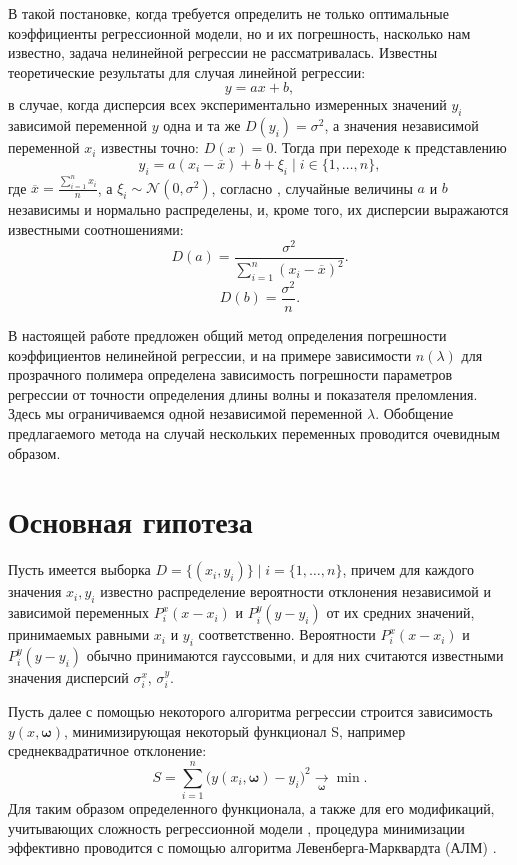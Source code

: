 \documentclass[11pt,a4paper]{article}
\theoremstyle{definition}
\begin{document}
В такой постановке, когда требуется определить не только
оптимальные коэффициенты регрессионной модели, но и их погрешность, насколько нам
известно, задача нелинейной регрессии не рассматривалась. Известны
теоретические результаты для случая линейной регрессии:
\[
  y = ax + b,
\]
в случае, когда дисперсия всех экспериментально измеренных значений $y_i$
зависимой переменной $y$ одна и та же $D(y_i) = \sigma^2$, а значения независимой
переменной $x_i$ известны точно: $D(x) = 0$. Тогда при переходе к представлению
\[
  y_i = a(x_i - \overline{x}) + b + \xi_i \mid i \in \{ 1, \dots, n \},
\]
где $\overline{x} = \frac{\sum_{i = 1}^n x_i}{n}$, а $\xi_i \sim \mathcal{N}(0, \sigma^2)$,
согласно \cite{Vatunin05}, случайные величины $a$ и $b$ независимы
и нормально распределены, и, кроме того, их дисперсии выражаются известными соотношениями:
\begin{equation}
  \label{eq:classic_da}
  D(a) = \frac{\sigma^2}{\sum_{i = 1}^n (x_i - \overline{x})^2}.
\end{equation}
\begin{equation}
  \label{eq:classic_db}
  D(b) = \frac{\sigma^2}{n}.
\end{equation}

В настоящей работе предложен общий метод определения
погрешности коэффициентов нелинейной регрессии, и на примере зависимости
$n(\lambda)$ для прозрачного полимера определена зависимость погрешности
параметров регрессии от точности определения длины волны и показателя
преломления. Здесь мы ограничиваемся одной
независимой переменной $\lambda$. Обобщение предлагаемого метода на случай
нескольких переменных проводится очевидным образом.

\section{Основная гипотеза}

Пусть имеется выборка $D = \{ (x_i, y_i) \} \mid i = \{ 1, \dots, n \}$,
причем для каждого значения $x_i, y_i$ известно распределение вероятности отклонения
независимой и зависимой переменных $P_i^x(x - x_i)$ и
$P_i^y(y - y_i)$ от их средних значений, принимаемых равными $x_i$ и
$y_i$ соответственно. Вероятности $P_i^x(x - x_i)$ и
$P_i^y(y - y_i)$ обычно принимаются гауссовыми, и для них
считаются известными значения дисперсий $\sigma_i^x$, $\sigma_i^y$.

Пусть далее с помощью некоторого алгоритма регрессии строится
зависимость $y(x, \boldsymbol{\omega})$, минимизирующая некоторый функционал S,
например среднеквадратичное отклонение:
\begin{equation}
  S = \sum_{i=1}^n \big(y (x_i, \boldsymbol{\omega}) - y_i\big)^2 \underset{\boldsymbol{\omega}}{\rightarrow} \min.
  \label{eq:S}
\end{equation}
Для таким образом определенного функционала, а также для его модификаций,
учитывающих сложность регрессионной модели \cite{Rudoy13}, процедура минимизации эффективно
проводится с помощью алгоритма Левенберга-Марквардта (АЛМ) \cite{Marquardt1963Algorithm,more:78}.
\end{document}
